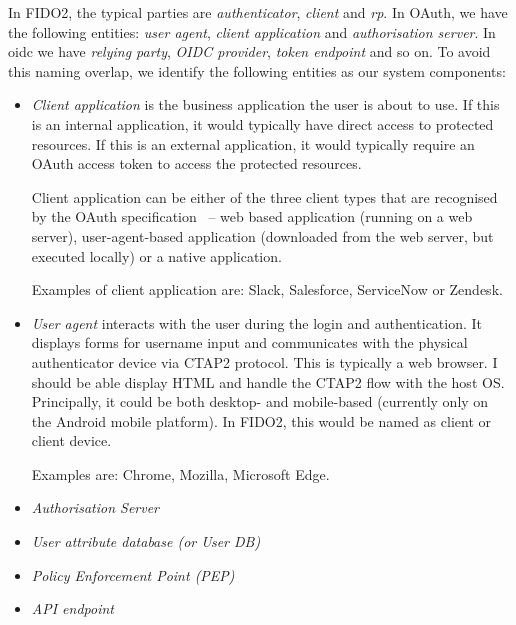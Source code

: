 In FIDO2, the typical parties are \textit{authenticator}, \textit{client} and \textit{\acrshort{rp}}. In OAuth, we have the following entities: \textit{user agent}, \textit{client application} and \textit{authorisation server}. In \acrshort{oidc} we have \textit{relying party}, \textit{OIDC provider}, \textit{token endpoint} and so on. To avoid this naming overlap, we identify the following entities as our system components:
% 
\begin{itemize}
    \item \textit{Client application} is the business application the user is about to use. If this is an internal application, it would typically have direct access to protected resources. If this is an external application, it would typically require an OAuth access token to access the protected resources.
    
    Client application can be either of the three client types that are recognised by the OAuth specification~\cite{Hardt2012TheFramework} -- web based application (running on a web server), user-agent-based application (downloaded from the web server, but executed locally) or a native application.
    
    Examples of client application are: Slack, Salesforce, ServiceNow or Zendesk.
    
    \item \textit{User agent} interacts with the user during the login and authentication. It displays forms for username input and communicates with the physical authenticator device via CTAP2 protocol. This is typically a web browser. I should be able display HTML and handle the CTAP2 flow with the host OS. Principally, it could be both desktop- and mobile-based (currently only on the Android mobile platform). In FIDO2, this would be named as client or client device.
    
    Examples are: Chrome, Mozilla, Microsoft Edge.
    
    \item \textit{Authorisation Server}
    
    \item \textit{User attribute database (or User DB)}
    
    \item \textit{Policy Enforcement Point (PEP)}
    
    \item \textit{API endpoint}
\end{itemize}
% 